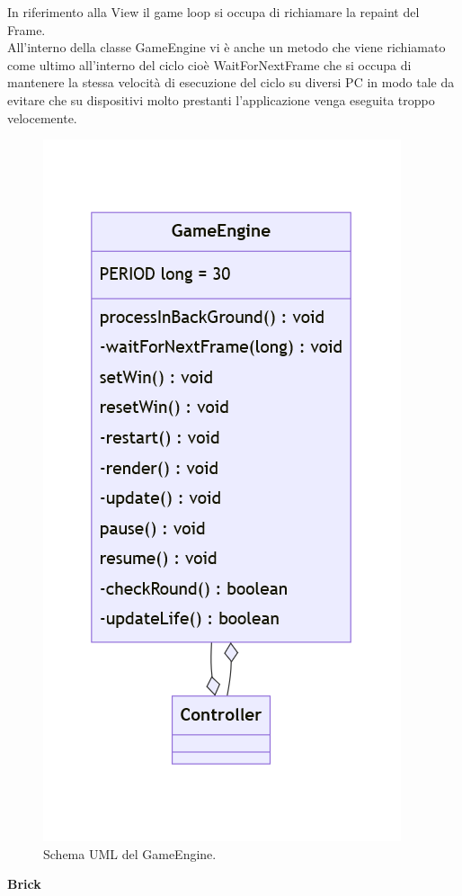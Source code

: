 \documentclass[a4paper,12pt]{report}
\begin{document}
In riferimento alla View il game loop si occupa di richiamare la repaint del Frame.
\\All'interno della classe GameEngine vi è anche un metodo che viene richiamato come ultimo all'interno del ciclo cioè WaitForNextFrame che si occupa di mantenere
la stessa velocità di esecuzione del ciclo su diversi PC in modo tale da evitare che su dispositivi molto prestanti l'applicazione venga eseguita troppo velocemente.
\begin{figure}[H]
    \centering{}
    \includegraphics[scale=0.5]{images/GameEngine.png}
    \caption{Schema UML del GameEngine.}
    \label{images:GameEngine}
\end{figure}
\textbf{Brick}\\
\end{document}
